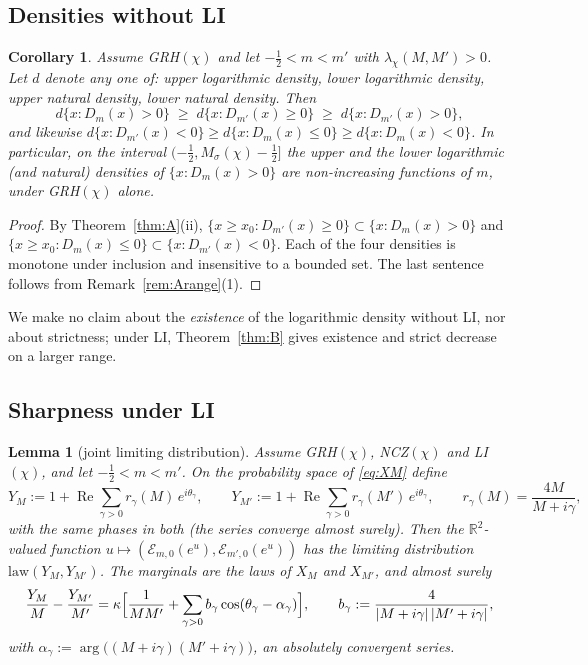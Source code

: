\documentclass[11pt]{amsart}
\newtheorem{lemma}[theorem]{Lemma}
\newtheorem{corollary}[theorem]{Corollary}
\theoremstyle{definition}
\numberwithin{equation}{section}
\newcommand{\cE}{\mathcal E}
\newcommand{\re}{\operatorname{Re}}
\begin{document}
\subsection{Densities without LI}

\begin{corollary}\label{cor:densities}
Assume GRH$(\chi)$ and let $-\tfrac12<m<m'$ with
$\lambda_\chi(M,M')>0$. Let $d$ denote any one of: upper logarithmic
density, lower logarithmic density, upper natural density, lower
natural density. Then
\[
d\{x:D_m(x)>0\}\;\ge\;d\{x:D_{m'}(x)\ge0\}\;\ge\;d\{x:D_{m'}(x)>0\},
\]
and likewise $d\{x:D_{m'}(x)<0\}\ge d\{x:D_m(x)\le0\}\ge d\{x:D_m(x)<0\}$.
In particular, on the interval $(-\tfrac12,M_\sigma(\chi)-\tfrac12]$
the upper and the lower logarithmic (and natural) densities of
$\{x:D_m(x)>0\}$ are non-increasing functions of $m$, under
GRH$(\chi)$ alone.
\end{corollary}

\begin{proof}
By Theorem~\ref{thm:A}(ii), $\{x\ge x_0:D_{m'}(x)\ge0\}
\subset\{x:D_m(x)>0\}$ and $\{x\ge x_0:D_m(x)\le0\}\subset
\{x:D_{m'}(x)<0\}$. Each of the four densities is monotone under
inclusion and insensitive to a bounded set. The last sentence follows
from Remark~\ref{rem:Arange}(1).
\end{proof}

We make no claim about the \emph{existence} of the logarithmic
density without LI, nor about strictness; under LI,
Theorem~\ref{thm:B} gives existence and strict decrease on a larger
range.

\subsection{Sharpness under LI}

\begin{lemma}[joint limiting distribution]\label{lem:joint}
Assume GRH$(\chi)$, NCZ$(\chi)$ and LI$(\chi)$, and let
$-\tfrac12<m<m'$. On the probability space of \eqref{eq:XM} define
\[
Y_M:=1+\re\sum_{\gamma>0}r_\gamma(M)\,e^{i\theta_\gamma},
\qquad
Y_{M'}:=1+\re\sum_{\gamma>0}r_\gamma(M')\,e^{i\theta_\gamma},
\qquad r_\gamma(M)=\frac{4M}{M+i\gamma},
\]
with the \emph{same} phases in both (the series converge almost
surely). Then the $\mathbb R^2$-valued function
$u\mapsto(\cE_{m,0}(e^u),\cE_{m',0}(e^u))$ has the limiting
distribution $\mathrm{law}(Y_M,Y_{M'})$.
The marginals are the laws of $X_M$ and $X_{M'}$, and almost surely
\begin{equation}\label{eq:Ydiff}
\frac{Y_M}{M}-\frac{Y_{M'}}{M'}
=\kappa\Bigl[\frac1{MM'}+\sum_{\gamma>0}b_\gamma\cos(\theta_\gamma-\alpha_\gamma)\Bigr],
\qquad b_\gamma:=\frac{4}{|M+i\gamma|\,|M'+i\gamma|},
\end{equation}
with $\alpha_\gamma:=\arg\bigl((M+i\gamma)(M'+i\gamma)\bigr)$, an
absolutely convergent series.
\end{lemma}
\end{document}
